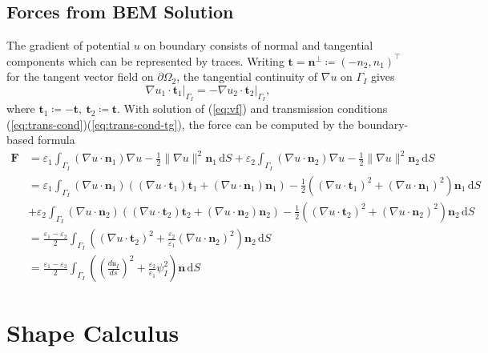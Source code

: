 \documentclass{article}
\theoremstyle{remark}
\newcommand{\dd}{\mathrm{d}}
\newcommand{\n}{\boldsymbol{n}}
\newcommand{\tg}{\boldsymbol{t}}
\newcommand{\argu}{\mathfrak{u}}
\newcommand{\mat}[1]{\mathbf{#1}}
\begin{document}
\subsection{Forces from BEM Solution}
The gradient of potential $u$ on boundary consists of normal and tangential components which can be represented by traces. Writing $\tg=\n^\perp\coloneqq(-n_2,n_1)^\top$ for the tangent vector field on $\partial\Omega_2$, the tangential continuity of $\nabla u$ on $\Gamma_I$ gives
\begin{equation}
\label{eq:trans-cond-tg}
    \left.\nabla u_1\cdot\tg_1\right|_{\Gamma_I}=-\left.\nabla u_2\cdot\tg_2\right|_{\Gamma_I},
\end{equation}
where $\tg_1\coloneqq-\tg,~\tg_2\coloneqq\tg$. With solution of (\ref{eq:vf}) and transmission conditions (\ref{eq:trans-cond})(\ref{eq:trans-cond-tg}), the force can be computed by the boundary-based formula
\begin{equation}
\label{eq:bdry-bem}
\begin{aligned}
    \mat{F}
    &=\varepsilon_1\int_{\Gamma_I}(\nabla u\cdot\n_1)\nabla u-\frac{1}{2}\|\nabla u\|^2\n_1\,\dd S
    +\varepsilon_2\int_{\Gamma_I}(\nabla u\cdot\n_2)\nabla u-\frac{1}{2}\|\nabla u\|^2\n_2\,\dd S\\
    &=\varepsilon_1\int_{\Gamma_I}\left(\nabla u\cdot\n_1\right)\left(\left(\nabla u\cdot\tg_1\right)\tg_1+\left(\nabla u\cdot\n_1\right)\n_1\right)-\frac{1}{2}\left(\left(\nabla u\cdot\tg_1\right)^2+\left(\nabla u\cdot\n_1\right)^2\right)\n_1\,\dd S\\
    &+\varepsilon_2\int_{\Gamma_I}\left(\nabla u\cdot\n_2\right)\left(\left(\nabla u\cdot\tg_2\right)\tg_2+\left(\nabla u\cdot\n_2\right)\n_2\right)-\frac{1}{2}\left(\left(\nabla u\cdot\tg_2\right)^2+\left(\nabla u\cdot\n_2\right)^2\right)\n_2\,\dd S\\
    &=\frac{\varepsilon_1-\varepsilon_2}{2}\int_{\Gamma_I}\left(\left(\nabla u\cdot\tg_2\right)^2+\frac{\varepsilon_2}{\varepsilon_1}\left(\nabla u\cdot\n_2\right)^2\right)\n_2\,\dd S\\
    &=\frac{\varepsilon_1-\varepsilon_2}{2}\int_{\Gamma_I}\left(\left(\frac{d\argu_I}{ds}\right)^2+\frac{\varepsilon_2}{\varepsilon_1}\psi_I^2\right)\n\,\dd S
\end{aligned}
\end{equation}

\section{Shape Calculus}
\end{document}
